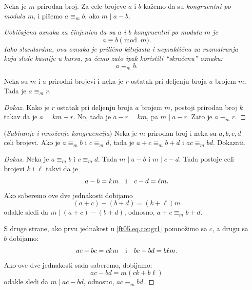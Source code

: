 \begin{DEF}
  Neka je $m$ prirodan broj. Za cele brojeve $a$ i $b$ ka\v zemo da su \emph{kongruentni po modulu $m$},
  i pi\v semo $a \equiv_m b$, ako $m \mid a - b$.
\end{DEF}

\begin{NAP}
  \textsl{Uobi\v cajena oznaka za \v cinjenicu da su $a$ i $b$ kongruentni po modulu $m$ je
  $$
    a \equiv b \pmod m.
  $$
  Iako standardna, ova oznaka je prili\v cno kitnjasta i neprakti\v cna za razmatranja koja slede kasnije u kursu,
  pa \'cemo zato ipak koristiti \enquote{skra\'cenu} oznaku:}
  $$
    a \equiv_m b.
  $$
\end{NAP}

\begin{EX}\label{ft05.ex.cong-r}
  Neka su $m$ i $a$ prirodni brojevi i neka je $r$ ostatak pri deljenju broja $a$ brojem $m$.
  Tada je $a \equiv_m r$.
\end{EX}
\begin{proof}[Dokaz]
  Kako je $r$ ostatak pri deljenju broja $a$ brojem $m$, postoji prirodan broj $k$
  takav da je $a = km + r$. No, tada je $a - r = km$, pa $m \mid a - r$.
  Zato je $a \equiv_m r$.
\end{proof}

\begin{EX}\label{ft05.ex.cong-sm} (\textit{Sabiranje i mno\v zenje kongruencija}) 
  Neka je $m$ prirodan broj i neka su $a, b, c, d$ celi brojevi. Ako je $a \equiv_m b$ i $c \equiv_m d$, tada je
  $a + c \equiv_m b + d$ i $ac \equiv_m bd$. Dokazati.
\end{EX}
\begin{proof}[Dokaz]
  Neka je $a \equiv_m b$ i $c \equiv_m d$. Tada $m \mid a - b$ i $m \mid c - d$. Tada postoje celi brojevi
  $k$ i $\ell$ takvi da je
  \begin{equation}\label{ft05.eq.congr1}
    a - b = km \text{\quad i\quad}
    c - d = \ell m.
  \end{equation}
  Ako saberemo ove dve jednakosti dobijamo
  $$
    (a + c) - (b + d) = (k + \ell) m
  $$
  odakle sledi da $m \mid (a + c) - (b + d)$, odnosno, $a + c \equiv_m b + d$.
  
  S druge strane, ako prvu jednakost u \eqref{ft05.eq.congr1} pomno\v zimo sa $c$, a drugu sa $b$ dobijamo:
  $$
    ac - bc = c k m \text{\quad i\quad}
    bc - bd = b \ell m.
  $$
  Ako ove dve jednakosti sada saberemo, dobijamo:
  $$
    ac - bd = m (c k + b \ell)
  $$
  odakle sledi da $m \mid a c - b d$, odnosno, $a c \equiv_m b d$.
\end{proof}

